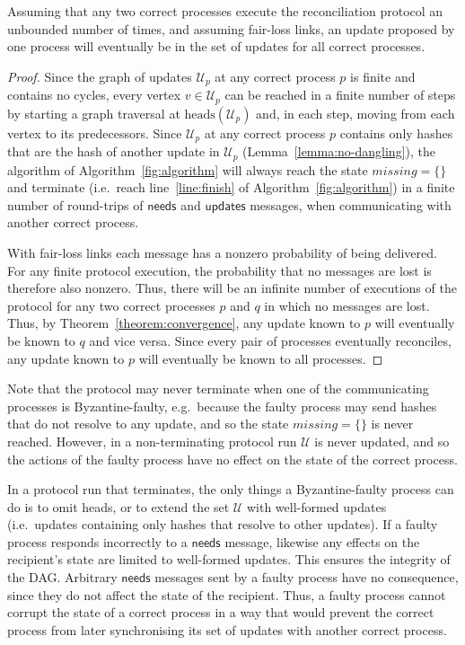 \documentclass[a4paper,anonymous,USenglish]{lipics-v2019}
\begin{document}
\begin{theorem}\label{theorem:liveness}
Assuming that any two correct processes execute the reconciliation protocol an unbounded number of times, and assuming fair-loss links, an update proposed by one process will eventually be in the set of updates for all correct processes.
\end{theorem}
\begin{proof}
Since the graph of updates $\mathcal{U}_p$ at any correct process $p$ is finite and contains no cycles, every vertex $v \in \mathcal{U}_p$ can be reached in a finite number of steps by starting a graph traversal at $\mathrm{heads}(\mathcal{U}_p)$ and, in each step, moving from each vertex to its predecessors.
Since $\mathcal{U}_p$ at any correct process $p$ contains only hashes that are the hash of another update in $\mathcal{U}_p$ (Lemma~\ref{lemma:no-dangling}), the algorithm of Algorithm~\ref{fig:algorithm} will always reach the state $\mathit{missing} = \{\}$ and terminate (i.e.\ reach line~\ref{line:finish} of Algorithm~\ref{fig:algorithm}) in a finite number of round-trips of $\mathsf{needs}$ and $\mathsf{updates}$ messages, when communicating with another correct process.

With fair-loss links each message has a nonzero probability of being delivered.
For any finite protocol execution, the probability that no messages are lost is therefore also nonzero.
Thus, there will be an infinite number of executions of the protocol for any two correct processes $p$ and $q$ in which no messages are lost.
Thus, by Theorem~\ref{theorem:convergence}, any update known to $p$ will eventually be known to $q$ and vice versa.
Since every pair of processes eventually reconciles, any update known to $p$ will eventually be known to all processes.
\end{proof}

Note that the protocol may never terminate when one of the communicating processes is Byzantine-faulty, e.g.\ because the faulty process may send hashes that do not resolve to any update, and so the state $\mathit{missing} = \{\}$ is never reached.
However, in a non-terminating protocol run $\mathcal{U}$ is never updated, and so the actions of the faulty process have no effect on the state of the correct process.

In a protocol run that terminates, the only things a Byzantine-faulty process can do is to omit heads, or to extend the set $\mathcal{U}$ with well-formed updates (i.e.\ updates containing only hashes that resolve to other updates).
If a faulty process responds incorrectly to a $\mathsf{needs}$ message, likewise any effects on the recipient's state are limited to well-formed updates.
This ensures the integrity of the DAG.
Arbitrary $\mathsf{needs}$ messages sent by a faulty process have no consequence, since they do not affect the state of the recipient.
Thus, a faulty process cannot corrupt the state of a correct process in a way that would prevent the correct process from later synchronising its set of updates with another correct process.
\end{document}
